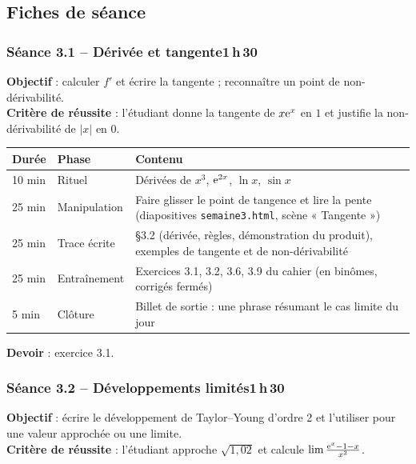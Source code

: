 \documentclass[10.5pt,a4paper]{article}
\newif\ifprof
\newcommand{\profonly}[1]{\ifprof #1\fi}
\begin{document}
\subsection{Fiches de séance}
\subsubsection*{\textcolor{marine}{Séance 3.1 -- Dérivée et tangente}\hfill\normalfont\small\textcolor{ardoise}{1\,h\,30}}
\begin{objectif}\textbf{Objectif} : calculer $f'$ et écrire la tangente ; reconnaître un point de non-dérivabilité.\\\textbf{Critère de réussite} : l'étudiant donne la tangente de $x\mathrm{e}^x$ en $1$ et justifie la non-dérivabilité de $|x|$ en $0$.\end{objectif}\nopagebreak
\begin{longtable}{@{}p{1.1cm}p{2.4cm}p{12.4cm}@{}}
\toprule \textbf{Durée} & \textbf{Phase} & \textbf{Contenu}\\ \midrule\endhead
10 min & Rituel & Dérivées de $x^3$, $\mathrm{e}^{2x}$, $\ln x$, $\sin x$\\
25 min & Manipulation & Faire glisser le point de tangence et lire la pente (diapositives \texttt{semaine3.html}, scène « Tangente »)\\
25 min & Trace écrite & \S3.2 (dérivée, règles, démonstration du produit), exemples de tangente et de non-dérivabilité\\
25 min & Entraînement & Exercices 3.1, 3.2, 3.6, 3.9 du cahier (en binômes, corrigés fermés)\\
5 min & Clôture & Billet de sortie : une phrase résumant le cas limite du jour\\ \bottomrule\end{longtable}\nopagebreak
\textbf{Devoir} : exercice 3.1.\profonly{ \textbf{Point de vigilance} : $x^2\sin\frac1x$ : dérivable en $0$ mais dérivée non continue, à présenter en fin de séance.}\par
{}\subsubsection*{\textcolor{marine}{Séance 3.2 -- Développements limités}\hfill\normalfont\small\textcolor{ardoise}{1\,h\,30}}
\begin{objectif}\textbf{Objectif} : écrire le développement de Taylor--Young d'ordre 2 et l'utiliser pour une valeur approchée ou une limite.\\\textbf{Critère de réussite} : l'étudiant approche $\sqrt{1{,}02}$ et calcule $\lim\frac{\mathrm{e}^x-1-x}{x^2}$.\end{objectif}\nopagebreak
\end{document}
